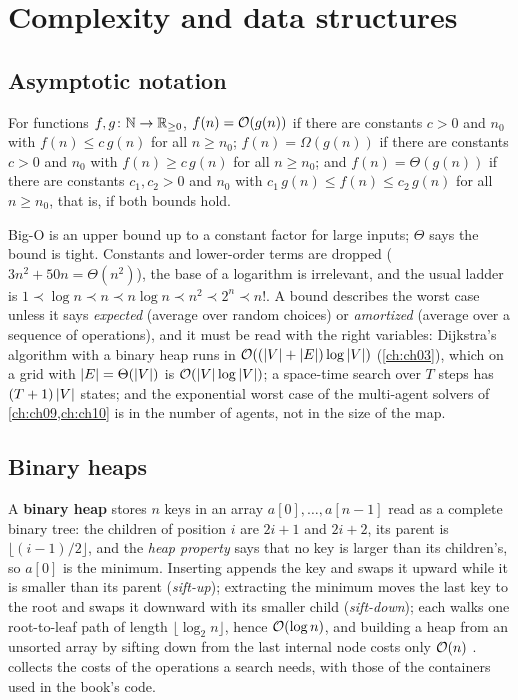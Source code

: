 \section{Complexity and data structures}
\label{sec:appB-complexity}

\subsection{Asymptotic notation}

\begin{definition}
\label{def:appB-bigO}
For functions $f, g\colon \mathbb{N} \to \mathbb{R}_{\ge 0}$, $f(n) = \mathcal{O}\!\left(g(n)\right)$ if there are constants $c > 0$ and $n_0$ with $f(n) \le c\,g(n)$ for all $n \ge n_0$; $f(n) = \Omega(g(n))$ if there are constants $c > 0$ and $n_0$ with $f(n) \ge c\,g(n)$ for all $n \ge n_0$; and $f(n) = \Theta(g(n))$ if there are constants $c_1, c_2 > 0$ and $n_0$ with $c_1\,g(n) \le f(n) \le c_2\,g(n)$ for all $n \ge n_0$, that is, if both bounds hold.
\end{definition}

Big-O is an upper bound up to a constant factor for large inputs; $\Theta$
says the bound is tight. Constants and lower-order terms are dropped ($3n^2 +
50n = \Theta(n^2)$), the base of a logarithm is irrelevant, and the usual
ladder is $1 \prec \log n \prec n \prec n\log n \prec n^2 \prec 2^n \prec n!$.
A bound describes the worst case unless it says \emph{expected} (average over
random choices) or \emph{amortized} (average over a sequence of operations),
and it must be read with the right variables: Dijkstra's algorithm with a
binary heap runs in $\mathcal{O}\!\left((\left\lvert V \right\rvert + \left\lvert E \right\rvert)\log\left\lvert V \right\rvert\right)$ (\cref{ch:ch03}),
which on a grid with $\left\lvert E \right\rvert = \Theta(\left\lvert V \right\rvert)$ is $\mathcal{O}\!\left(\left\lvert V \right\rvert\log\left\lvert V \right\rvert\right)$;
a space-time search over $T$ steps has $(T+1)\left\lvert V \right\rvert$ states; and the
exponential worst case of the multi-agent solvers of \cref{ch:ch09,ch:ch10} is
in the number of agents, not in the size of the map.

\subsection{Binary heaps}

A \textbf{binary heap} stores $n$ keys in an array $a[0],
\dots, a[n-1]$ read as a complete binary tree: the children of position $i$
are $2i+1$ and $2i+2$, its parent is $\lfloor (i-1)/2 \rfloor$, and the
\emph{heap property} says that no key is larger than its children's, so
$a[0]$ is the minimum. Inserting appends the key and swaps it upward while it
is smaller than its parent (\emph{sift-up}); extracting the minimum moves the
last key to the root and swaps it downward with its smaller child
(\emph{sift-down}); each walks one root-to-leaf path of length $\lfloor \log_2
n \rfloor$, hence $\mathcal{O}\!\left(\log n\right)$, and building a heap from an unsorted array
by sifting down from the last internal node costs only $\mathcal{O}\!\left(n\right)$
\cite[Chapter~6]{cormen2009clrs}.  collects the costs of
the operations a search needs, with those of the \python containers used in
the book's code.

